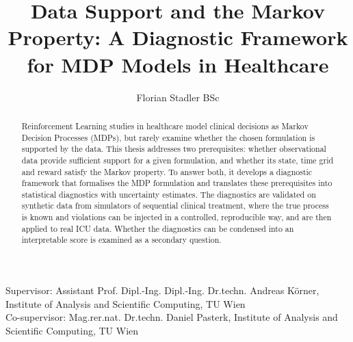 \documentclass[runningheads]{llncs}
\begin{document}
%
\title{Data Support and the Markov Property: A Diagnostic Framework for MDP Models in Healthcare}
%
%
\author{Florian Stadler BSc}
%
%
%
\maketitle
%
Supervisor: Assistant Prof. Dipl.-Ing. Dipl.-Ing. Dr.techn. Andreas K\"orner, Institute of Analysis and Scientific Computing, TU Wien \\
Co-supervisor: Mag.rer.nat. Dr.techn. Daniel Pasterk, Institute of Analysis and Scientific Computing, TU Wien

\begin{abstract}
Reinforcement Learning studies in healthcare model clinical decisions as Markov Decision Processes (MDPs), but rarely examine whether the chosen formulation is supported by the data. This thesis addresses two prerequisites: whether observational data provide sufficient support for a given formulation, and whether its state, time grid and reward satisfy the Markov property. To answer both, it develops a diagnostic framework that formalises the MDP formulation and translates these prerequisites into statistical diagnostics with uncertainty estimates. The diagnostics are validated on synthetic data from simulators of sequential clinical treatment, where the true process is known and violations can be injected in a controlled, reproducible way, and are then applied to real ICU data. Whether the diagnostics can be condensed into an interpretable score is examined as a secondary question.

\end{abstract}
%
\end{document}
